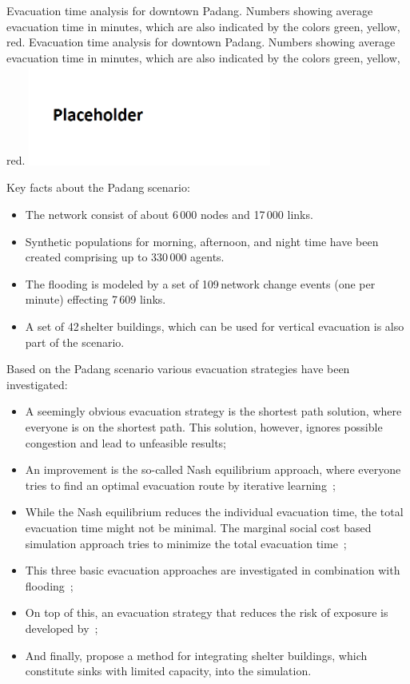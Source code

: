 %
\createfigure%
{Evacuation time analysis for downtown Padang. Numbers showing average evacuation time in minutes, which are also indicated by the colors green, yellow, red.}%
{Evacuation time analysis for downtown Padang. Numbers showing average evacuation time in minutes, which are also indicated by the colors green, yellow, red.}%
{\label{chap:using:padang}}%
{\includegraphics[width=0.6\textwidth, angle=0]{using/figures/dwntwnpdg}}%
{}

Key facts about the Padang scenario:
\begin{itemize}
\item The network consist of about 6\,000 nodes and 17\,000 links.
\item Synthetic populations for morning, afternoon, and night time have been created comprising up to 330\,000 agents.
\item The flooding is modeled by a set of 109\,network change events (one per minute) effecting 7\,609 links.
\item A set of 42\,shelter buildings, which can be used for vertical evacuation is also part of the scenario.
\end{itemize}
Based on the Padang scenario various evacuation strategies have been investigated:
\begin{itemize}
\item A seemingly obvious evacuation strategy is the shortest path solution, where everyone is on the shortest path. This solution, however, ignores possible congestion and lead to unfeasible results;
\item  An improvement is the so-called Nash equilibrium approach, where everyone tries to find an optimal evacuation route by iterative learning~\citep{LaemmelKluepfelNagel2009EvacPadangAtBookTimmermanns};
\item While the Nash equilibrium reduces the individual evacuation time, the total evacuation time might not be minimal. The marginal social cost based simulation approach tries to minimize the total evacuation time~\citep{LaemmelFloetteroed_MertschingEtAl_2009,DresslerFloetteroedLaemmelNagelSkutella2010OptimalEvacuationLargeScaleScenarios};
\item This three basic evacuation approaches are investigated in combination with flooding~\citep{LaemmelEtAl_TransResC_2010,Laemmel_PhDThesis_2011};
\item On top of this, an evacuation strategy that reduces the risk of exposure is developed by~\citep{LaemmelKluepfelNagel2010PEDRiskPrinted};
\item And finally, \citet{FloetteroedLaemmel2010ICECShelterEvac} propose a method for integrating shelter buildings, which constitute sinks with limited capacity, into the simulation.  
\end{itemize}

